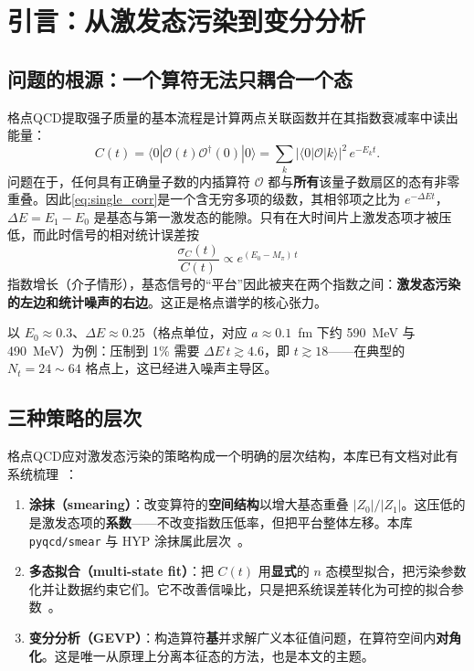\documentclass[12pt,a4paper]{ctexart}
\theoremstyle{definition}
\newcommand{\dagg}{\dagger}
\newcommand{\code}[1]{\texttt{#1}}
\begin{document}
\tableofcontents
\newpage

\section{引言：从激发态污染到变分分析}\label{sec:intro}

\subsection{问题的根源：一个算符无法只耦合一个态}

格点QCD提取强子质量的基本流程是计算两点关联函数并在其指数衰减率中读出能量：
\begin{equation}
C(t) = \langle 0 | \mathcal{O}(t) \mathcal{O}^\dagg(0) | 0 \rangle
     = \sum_k |\langle 0|\mathcal{O}|k\rangle|^2\, e^{-E_k t}.
\label{eq:single_corr}
\end{equation}
问题在于，任何具有正确量子数的内插算符 $\mathcal{O}$ 都与\textbf{所有}该量子数扇区的态有非零重叠。因此\eqref{eq:single_corr}是一个含无穷多项的级数，其相邻项之比为 $e^{-\Delta E t}$，$\Delta E = E_1-E_0$ 是基态与第一激发态的能隙。只有在大时间片上激发态项才被压低，而此时信号的相对统计误差按
\begin{equation}
\frac{\sigma_C(t)}{C(t)} \propto e^{(E_0 - M_\pi)\, t}
\end{equation}
指数增长（介子情形），基态信号的``平台''因此被夹在两个指数之间：\textbf{激发态污染的左边和统计噪声的右边}。这正是格点谱学的核心张力。

以 $E_0\approx0.3$、$\Delta E\approx0.25$（格点单位，对应 $a\approx0.1$~fm 下约 590~MeV 与 490~MeV）为例：压制到 1\% 需要 $\Delta E\,t \gtrsim 4.6$，即 $t \gtrsim 18$——在典型的 $N_t=24\sim64$ 格点上，这已经进入噪声主导区。

\subsection{三种策略的层次}

格点QCD应对激发态污染的策略构成一个明确的层次结构，本库已有文档对此有系统梳理~\cite{hadronSpectroscopy2026,correlationFunctions2026}：

\begin{enumerate}[nosep]
    \item \textbf{涂抹（smearing）}：改变算符的\textbf{空间结构}以增大基态重叠 $|Z_0|/|Z_1|$。这压低的是激发态项的\textbf{系数}——不改变指数压低率，但把平台整体左移。本库 \code{pyqcd/smear} 与 HYP 涂抹属此层次~\cite{GaugeSmearing}。
    \item \textbf{多态拟合（multi-state fit）}：把 $C(t)$ 用\textbf{显式}的 $n$ 态模型拟合，把污染参数化并让数据约束它们。它不改善信噪比，只是把系统误差转化为可控的拟合参数~\cite{GattringerLang2010}。
    \item \textbf{变分分析（GEVP）}：构造算符\textbf{基}并求解广义本征值问题，在算符空间内\textbf{对角化}。这是唯一从原理上分离本征态的方法，也是本文的主题。
\end{enumerate}
\end{document}
